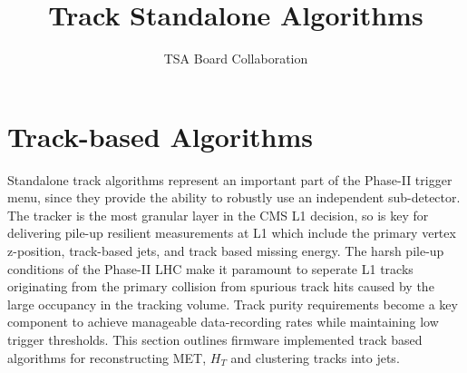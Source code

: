 \documentclass[12pt,a4paper]{article}
\author{TSA Board Collaboration}
\title{Track Standalone Algorithms}
\begin{document}
\section{ Track-based Algorithms}


Standalone track algorithms represent an important part of the Phase-II trigger menu, since they provide the ability to robustly use an independent sub-detector. The tracker is the most granular layer in the CMS L1 decision, so is key for delivering pile-up resilient measurements at L1 which include the primary vertex z-position, track-based jets, and track based missing energy. The harsh pile-up conditions of the Phase-II LHC make it paramount to seperate L1 tracks originating from the primary collision from spurious track hits caused by the large occupancy in the tracking volume. Track purity requirements become a key component to achieve manageable data-recording rates while maintaining low trigger thresholds. This section outlines firmware implemented track based algorithms for reconstructing MET, $H_{T}$ and clustering tracks into jets. 
\end{document}
